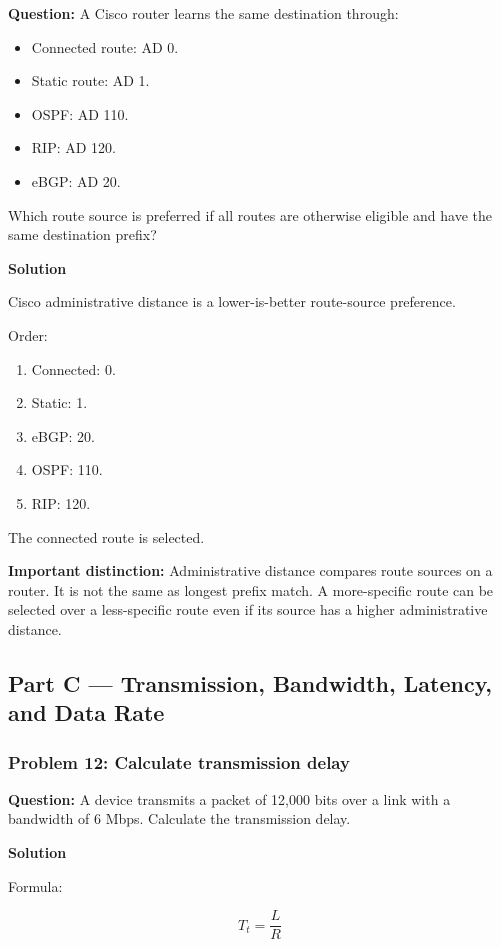 \textbf{Question:} A Cisco router learns the same destination through:

\begin{itemize}
\item Connected route: AD 0.
\item Static route: AD 1.
\item OSPF: AD 110.
\item RIP: AD 120.
\item eBGP: AD 20.
\end{itemize}

Which route source is preferred if all routes are otherwise eligible and have the same destination prefix?

\textbf{Solution}

Cisco administrative distance is a lower-is-better route-source preference.

Order:

\begin{enumerate}
\item Connected: 0.
\item Static: 1.
\item eBGP: 20.
\item OSPF: 110.
\item RIP: 120.
\end{enumerate}

The connected route is selected.

\textbf{Important distinction:} Administrative distance compares route sources on a router. It is not the same as longest prefix match. A more-specific route can be selected over a less-specific route even if its source has a higher administrative distance.

\subsection{Part C --- Transmission, Bandwidth, Latency, and Data Rate}
\subsubsection*{Problem 12: Calculate transmission delay}

\textbf{Question:} A device transmits a packet of 12,000 bits over a link with a bandwidth of 6 Mbps. Calculate the transmission delay.

\textbf{Solution}

Formula:



\[
T_t=\frac{L}{R}
\]



